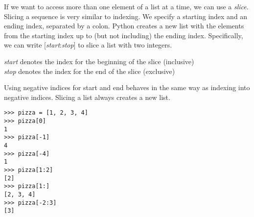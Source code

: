 If we want to access more than one element of a list at a time, we can use a
\textit{slice}. Slicing a sequence is very similar to indexing. We specify a
starting index and an ending index, separated by a colon. Python creates a new
list with the elements from the starting index up to (but not including) the
ending index. Specifically, we can write [\textit{start}:\textit{stop}] to slice a list with two integers.

\textit{start} denotes the index for the beginning of the slice (inclusive)\\
\textit{stop} denotes the index for the end of the slice (exclusive)

Using negative indices for start and end behaves in the same way as indexing
into negative indices. Slicing a list always creates a new list.

\begin{lstlisting}
>>> pizza = [1, 2, 3, 4]
>>> pizza[0]
1
>>> pizza[-1]
4
>>> pizza[-4]
1
>>> pizza[1:2]
[2]
>>> pizza[1:]
[2, 3, 4]
>>> pizza[-2:3]
[3]
\end{lstlisting}
